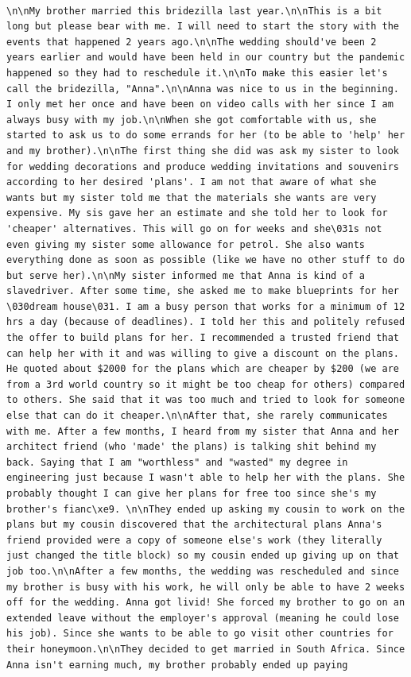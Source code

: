\documentclass[
  letterpaper,
  DIV=11,
  numbers=noendperiod]{scrreprt}
\begin{document}
\begin{verbatim}
                                                                                                                                                                                                                                                                                                                                                                                \n\nMy brother married this bridezilla last year.\n\nThis is a bit long but please bear with me. I will need to start the story with the events that happened 2 years ago.\n\nThe wedding should've been 2 years earlier and would have been held in our country but the pandemic happened so they had to reschedule it.\n\nTo make this easier let's call the bridezilla, "Anna".\n\nAnna was nice to us in the beginning. I only met her once and have been on video calls with her since I am always busy with my job.\n\nWhen she got comfortable with us, she started to ask us to do some errands for her (to be able to 'help' her and my brother).\n\nThe first thing she did was ask my sister to look for wedding decorations and produce wedding invitations and souvenirs according to her desired 'plans'. I am not that aware of what she wants but my sister told me that the materials she wants are very expensive. My sis gave her an estimate and she told her to look for 'cheaper' alternatives. This will go on for weeks and she\031s not even giving my sister some allowance for petrol. She also wants everything done as soon as possible (like we have no other stuff to do but serve her).\n\nMy sister informed me that Anna is kind of a slavedriver. After some time, she asked me to make blueprints for her \030dream house\031. I am a busy person that works for a minimum of 12 hrs a day (because of deadlines). I told her this and politely refused the offer to build plans for her. I recommended a trusted friend that can help her with it and was willing to give a discount on the plans. He quoted about $2000 for the plans which are cheaper by $200 (we are from a 3rd world country so it might be too cheap for others) compared to others. She said that it was too much and tried to look for someone else that can do it cheaper.\n\nAfter that, she rarely communicates with me. After a few months, I heard from my sister that Anna and her architect friend (who 'made' the plans) is talking shit behind my back. Saying that I am "worthless" and "wasted" my degree in engineering just because I wasn't able to help her with the plans. She probably thought I can give her plans for free too since she's my brother's fianc\xe9. \n\nThey ended up asking my cousin to work on the plans but my cousin discovered that the architectural plans Anna's friend provided were a copy of someone else's work (they literally just changed the title block) so my cousin ended up giving up on that job too.\n\nAfter a few months, the wedding was rescheduled and since my brother is busy with his work, he will only be able to have 2 weeks off for the wedding. Anna got livid! She forced my brother to go on an extended leave without the employer's approval (meaning he could lose his job). Since she wants to be able to go visit other countries for their honeymoon.\n\nThey decided to get married in South Africa. Since Anna isn't earning much, my brother probably ended up paying 
\end{verbatim}
\end{document}
